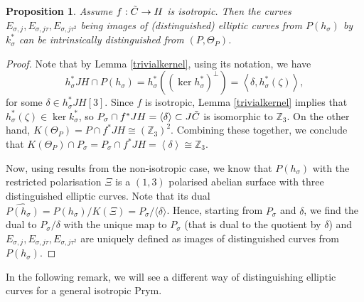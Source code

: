 \documentclass{amsart}
\newtheorem{prop}[thm]{Proposition}
\theoremstyle{remark}
\numberwithin{equation}{section}
\newcommand{\ZZ}{\mathbb Z}
\newcommand{\tC}{\Tilde{C}}
\newcommand{\s}{\sigma}
\begin{document}
\begin{prop}
\label{eliso}
     Assume $f:\tC \to H$ is isotropic. Then the curves $E_{\sigma,j}, E_{\sigma,j\tau}, E_{\sigma,j\tau^2}$ being images of (distinguished) elliptic curves from $P(h_\s)$ by $k_\s^*$ can be intrinsically distinguished from $(P,\Theta_P)$. 
\end{prop}
\begin{proof}
Note that by Lemma \ref{trivialkernel}, using its notation, we have  $$h_{\sigma}^*JH \cap P(h_{\sigma}) = h_{\sigma}^*((\ker h_{\sigma}^*)^{\bot})=\left<\delta,
h_{\s}^*(\zeta)\right>,$$ for some $\delta\in h_{\sigma}^*JH[3]$.
Since $f$ is isotropic, Lemma \ref{trivialkernel} implies that $h_{\s}^*(\zeta) \in \ker k_{\s}^*$, so $P_\s \cap f^*JH=\left<\delta\right> \subset J\tC$ is isomorphic to $\ZZ_3$. On the other hand, $K(\Theta_P)=P\cap f^*JH\cong (\ZZ_3)^2$.
Combining these together, we conclude that $K(\Theta_P)\cap P_\s=P_\s \cap f^*JH=\left<\delta\right>\cong\ZZ_3$.

Now, using results from the non-isotropic case, we know that $P(h_{\sigma})$ with the restricted polarisation $\Xi$ is a $(1,3)$ polarised abelian surface with three distinguished elliptic curves. Note that its dual $\widehat{P(h_{\sigma})}=P(h_{\sigma})/K(\Xi)=P_\s/\langle \delta \rangle$. Hence, starting from $P_\s$ and $\delta$, we find the dual to $P_\s/\delta$ with the unique map to $P_\s$ (that is dual to the quotient by $\delta$) and $E_{\sigma,j}, E_{\sigma,j\tau}, E_{\sigma,j\tau^2}$ are uniquely defined as images of distinguished curves from $P(h_{\sigma})$. 
\end{proof}

In the following remark, we will see a different way of distinguishing elliptic curves for a general isotropic Prym. 
\end{document}
